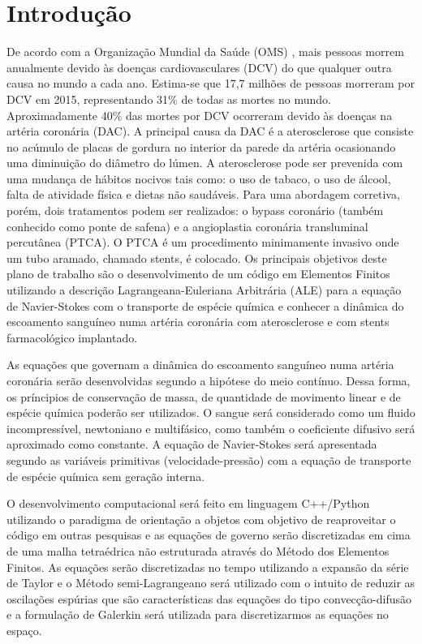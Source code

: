 \section{Introdução}

De acordo com a Organização Mundial da Saúde (OMS) \cite{site oms 2020}, mais pessoas morrem anualmente devido às doenças cardiovasculares (DCV) do que qualquer outra causa no mundo a cada ano. 
Estima-se que 17,7 milhões de pessoas morreram por DCV em 2015, representando 31\% de todas as mortes no mundo. 
Aproximadamente 40\% das mortes por DCV ocorreram devido às doenças na artéria coronária (DAC). 
A principal causa da DAC é a aterosclerose que consiste no acúmulo de placas de gordura no interior da parede da artéria ocasionando uma diminuição do diâmetro do lúmen. 
A aterosclerose pode ser prevenida com uma mudança de hábitos nocivos tais como: o uso de tabaco, o uso de álcool, falta de atividade física e dietas não saudáveis. \cite{site oms habitos} 
Para uma abordagem corretiva, porém, dois tratamentos podem ser realizados: o bypass coronário (também conhecido como ponte de safena) e a angioplastia coronária transluminal percutânea (PTCA). 
O PTCA é um procedimento minimamente invasivo onde um tubo aramado, chamado stents, é colocado. \cite{ref review PTCA}
Os principais objetivos deste plano de trabalho são o desenvolvimento de um código em Elementos Finitos utilizando a descrição Lagrangeana-Euleriana Arbitrária (ALE) \cite{donea} para a equação de Navier-Stokes com o transporte de espécie química e 
conhecer a dinâmica do escoamento sanguíneo numa artéria coronária com aterosclerose e com stents farmacológico implantado.

\medskip
As equações que governam a dinâmica do escoamento sanguíneo numa artéria coronária serão desenvolvidas segundo a hipótese do meio contínuo. 
Dessa forma, os príncipios de conservação de massa, de quantidade de movimento linear e de espécie química poderão ser utilizados. 
O sangue será considerado como um fluido incompressível, newtoniano e multifásico, como também o coeficiente difusivo será aproximado como constante. 
A equação de Navier-Stokes será apresentada segundo as variáveis primitivas (velocidade-pressão) com a equação de transporte de espécie química sem geração interna.
 
\medskip
O desenvolvimento computacional será feito em linguagem C++/Python \cite{c++} \cite{pyhon} utilizando o paradigma de orientação a objetos com objetivo de reaproveitar o código em outras pesquisas e 
as equações de governo serão discretizadas em cima de uma malha tetraédrica não estruturada através do Método dos Elementos Finitos. 
As equações serão discretizadas no tempo utilizando a expansão da série de Taylor e 
o Método semi-Lagrangeano \cite{pironneau} será utilizado com o intuito de reduzir as oscilações espúrias que são características das equações do tipo convecção-difusão e 
a formulação de Galerkin \cite{galerkin} será utilizada para discretizarmos as equações no espaço. 
 
